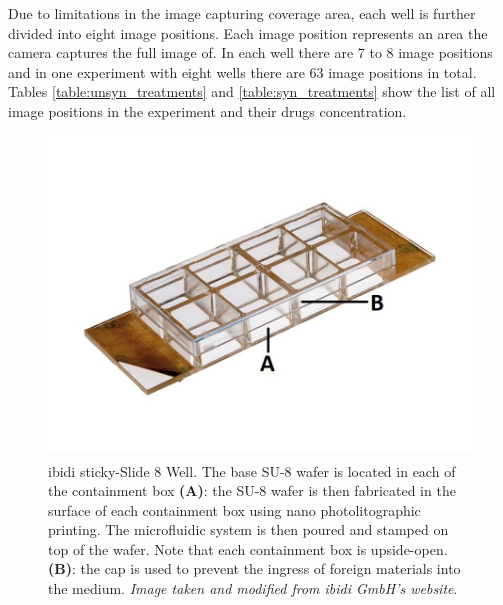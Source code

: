 \documentclass[pdftex,12pt,a4paper]{report}
\begin{document}
Due to limitations in the image capturing coverage area, each well is further divided into eight image positions. Each image position represents an area the camera captures the full image of. In each well there are 7 to 8 image positions and in one experiment with eight wells there are 63 image positions in total. Tables  \ref{table:unsyn_treatments} and \ref{table:syn_treatments} show the list of all image positions in the experiment and their drugs concentration.

\begin{figure}[H]
\centering
\includegraphics[width=\textwidth]{images/sticky-slide-8-well-marked}
\caption[ibidi\textsuperscript{\textregistered} sticky-Slide 8 Well]{ibidi\textsuperscript{\textregistered} sticky-Slide 8 Well. The base SU-8 wafer is located in each of the containment box \textbf{(A)}: the SU-8 wafer is then fabricated in the surface of each containment box using nano photolitographic printing. The microfluidic system is then poured and stamped on top of the wafer. Note that each containment box is upside-open. \textbf{(B)}: the cap is used to prevent the ingress of foreign materials into the medium. \textit{Image taken and modified from ibidi GmbH's website}.}
\label{fig:ibidi}
\end{figure}
\end{document}

